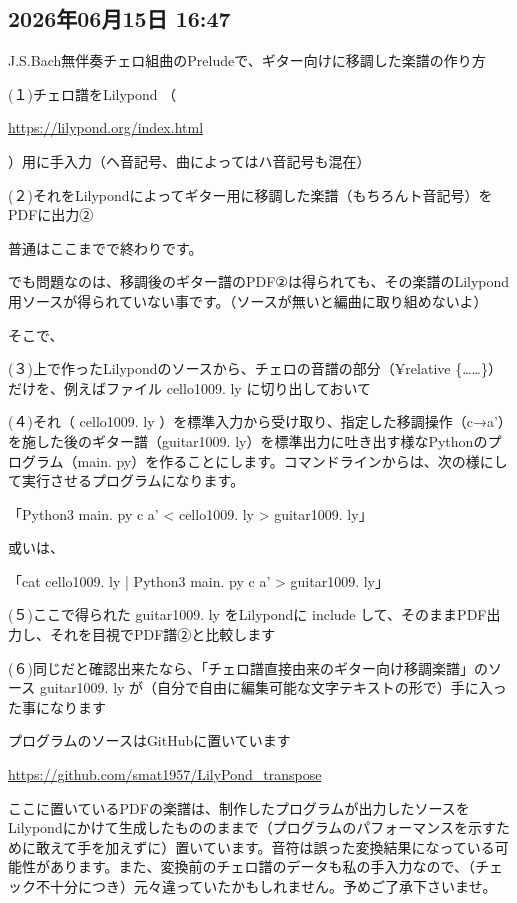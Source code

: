 \documentclass[facebook_diary.tex]{subfiles}
\begin{document}
\subsection*{2026年06月15日 16:47}

J.S.Bach無伴奏チェロ組曲のPreludeで、ギター向けに移調した楽譜の作り方


(１)チェロ譜をLilypond （ 

\url{https://lilypond.org/index.html}

 ）用に手入力（ヘ音記号、曲によってはハ音記号も混在）

(２)それをLilypondによってギター用に移調した楽譜（もちろんト音記号）をPDFに出力②


普通はここまでで終わりです。

でも問題なのは、移調後のギター譜のPDF②は得られても、その楽譜のLilypond用ソースが得られていない事です。（ソースが無いと編曲に取り組めないよ）


そこで、

(３)上で作ったLilypondのソースから、チェロの音譜の部分（¥relative \{……\}）だけを、例えばファイル cello1009. ly に切り出しておいて

(４)それ（ cello1009. ly ）を標準入力から受け取り、指定した移調操作（c→a’）を施した後のギター譜（guitar1009. ly）を標準出力に吐き出す様なPythonのプログラム（main. py）を作ることにします。コマンドラインからは、次の様にして実行させるプログラムになります。


「Python3 main. py c a’ <  cello1009. ly > guitar1009. ly」

或いは、

「cat cello1009. ly | Python3 main. py c a’ > guitar1009. ly」


(５)ここで得られた guitar1009. ly をLilypondに include して、そのままPDF出力し、それを目視でPDF譜②と比較します

(６)同じだと確認出来たなら、「チェロ譜直接由来のギター向け移調楽譜」のソース guitar1009. ly が（自分で自由に編集可能な文字テキストの形で）手に入った事になります


プログラムのソースはGitHubに置いています

\url{https://github.com/smat1957/LilyPond_transpose}



ここに置いているPDFの楽譜は、制作したプログラムが出力したソースをLilypondにかけて生成したもののままで（プログラムのパフォーマンスを示すために敢えて手を加えずに）置いています。音符は誤った変換結果になっている可能性があります。また、変換前のチェロ譜のデータも私の手入力なので、（チェック不十分につき）元々違っていたかもしれません。予めご了承下さいませ。
\end{document}
